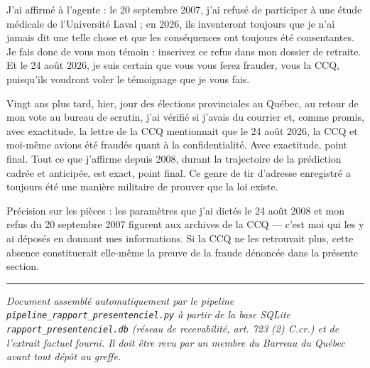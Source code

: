 \documentclass[12pt,letterpaper,oneside]{article}
\begin{document}
J'ai affirmé à l'agente : le 20 septembre 2007, j'ai refusé de participer à
une étude médicale de l'Université Laval ; en 2026, ils inventeront toujours
que je n'ai jamais dit une telle chose et que les conséquences ont toujours
été consentantes. Je fais donc de vous mon témoin : inscrivez ce refus dans
mon dossier de retraite. Et le 24 août 2026, je suis certain que vous vous
ferez frauder, vous la CCQ, puisqu'ils voudront voler le témoignage que je
vous fais.

Vingt ans plus tard, hier, jour des élections provinciales au Québec, au
retour de mon vote au bureau de scrutin, j'ai vérifié si j'avais du courrier
et, comme promis, avec exactitude, la lettre de la CCQ mentionnait que le
24 août 2026, la CCQ et moi-même avions été fraudés quant à la
confidentialité. Avec exactitude, point final. Tout ce que j'affirme depuis
2008, durant la trajectoire de la prédiction cadrée et anticipée, est exact,
point final. Ce genre de tir d'adresse enregistré a toujours été une manière
militaire de prouver que la loi existe.

Précision sur les pièces : les paramètres que j'ai dictés le 24 août 2008 et
mon refus du 20 septembre 2007 figurent aux archives de la CCQ — c'est moi
qui les y ai déposés en donnant mes informations. Si la CCQ ne les retrouvait
plus, cette absence constituerait elle-même la preuve de la fraude
dénoncée dans la présente section.


\vspace{0.8cm}
\hrule
\vspace{0.4em}
\small\emph{Document assemblé automatiquement par le pipeline \texttt{pipeline\_rapport\_presentenciel.py} à partir de la base SQLite \texttt{rapport\_presentenciel.db} (réseau de recevabilité, art. 723 (2) C.cr.) et de l'extrait factuel fourni. Il doit être revu par un membre du Barreau du Québec avant tout dépôt au greffe.}
\end{document}
